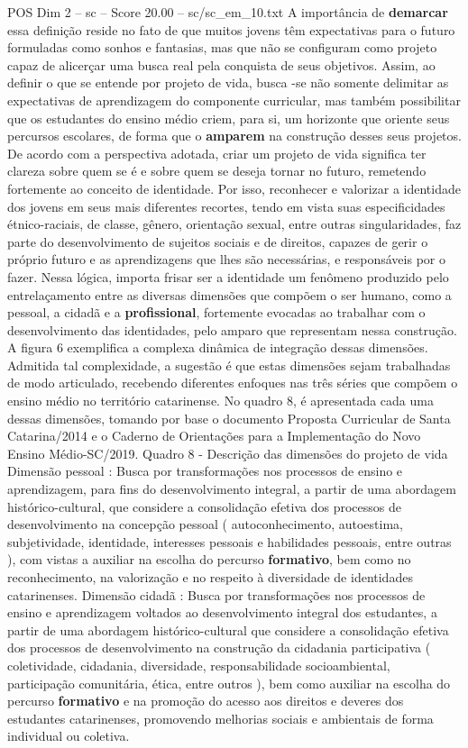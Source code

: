 \begin{textsample}{POS Dim 2 – sc – Score 20.00 – sc/sc\_em\_10.txt}
A importância de \textbf{demarcar} essa definição reside no fato de que muitos jovens têm expectativas para o futuro formuladas como sonhos e fantasias, mas que não se configuram como projeto capaz de alicerçar uma busca real pela conquista de seus objetivos.
Assim, ao definir o que se entende por projeto de vida, busca -se não somente delimitar as expectativas de aprendizagem do componente curricular, mas também possibilitar que os estudantes do ensino médio criem, para si, um horizonte que oriente seus percursos escolares, de forma que o \textbf{amparem} na construção desses seus projetos.
De acordo com a perspectiva adotada, criar um projeto de vida significa ter clareza sobre quem se é e sobre quem se deseja tornar no futuro, remetendo fortemente ao conceito de identidade.
Por isso, reconhecer e valorizar a identidade dos jovens em seus mais diferentes recortes, tendo em vista suas especificidades étnico-raciais, de classe, gênero, orientação sexual, entre outras singularidades, faz parte do desenvolvimento de sujeitos sociais e de direitos, capazes de gerir o próprio futuro e as aprendizagens que lhes são necessárias, e responsáveis por o fazer.
Nessa lógica, importa frisar ser a identidade um fenômeno produzido pelo entrelaçamento entre as diversas dimensões que compõem o ser humano, como a pessoal, a cidadã e a \textbf{profissional}, fortemente evocadas ao trabalhar com o desenvolvimento das identidades, pelo amparo que representam nessa construção.
A figura 6 exemplifica a complexa dinâmica de integração dessas dimensões.
Admitida tal complexidade, a sugestão é que estas dimensões sejam trabalhadas de modo articulado, recebendo diferentes enfoques nas três séries que compõem o ensino médio no território catarinense.
No quadro 8, é apresentada cada uma dessas dimensões, tomando por base o documento Proposta Curricular de Santa Catarina/2014 e o Caderno de Orientações para a Implementação do Novo Ensino Médio-SC/2019.
Quadro 8 - Descrição das dimensões do projeto de vida Dimensão pessoal : Busca por transformações nos processos de ensino e aprendizagem, para fins do desenvolvimento integral, a partir de uma abordagem histórico-cultural, que considere a consolidação efetiva dos processos de desenvolvimento na concepção pessoal ( autoconhecimento, autoestima, subjetividade, identidade, interesses pessoais e habilidades pessoais, entre outras ), com vistas a auxiliar na escolha do percurso \textbf{formativo}, bem como no reconhecimento, na valorização e no respeito à diversidade de identidades catarinenses.
Dimensão cidadã : Busca por transformações nos processos de ensino e aprendizagem voltados ao desenvolvimento integral dos estudantes, a partir de uma abordagem histórico-cultural que considere a consolidação efetiva dos processos de desenvolvimento na construção da cidadania participativa ( coletividade, cidadania, diversidade, responsabilidade socioambiental, participação comunitária, ética, entre outros ), bem como auxiliar na escolha do percurso \textbf{formativo} e na promoção do acesso aos direitos e deveres dos estudantes catarinenses, promovendo melhorias sociais e ambientais de forma individual ou coletiva.

\end{textsample}
